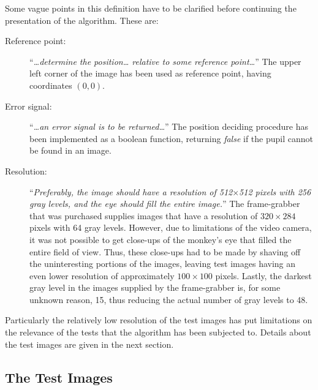 \noindent Some vague points in this definition have to be clarified
before continuing the presentation of the algorithm.  These are:
\begin{description}
\item[Reference point:] ``{\em\ldots determine the position\ldots
    relative to some reference point\ldots\/}'' The upper left corner
  of the image has been used as reference point, having coordinates
  $(0,0)$.
\item[Error signal:] ``{\em\ldots an error signal is to be
    returned\ldots\/}'' The position deciding procedure has been
  implemented as a boolean function, returning {\em false\/} if the
  pupil cannot be found in an image.
\item[Resolution:] ``{\em Preferably, the image should have a
    resolution of 512$\times$512 pixels with 256 gray levels, and the
    eye should fill the entire image.\/}'' The frame-grabber that was
  purchased supplies images that have a resolution of $320\times 284$
  pixels with 64 gray levels.  However, due to limitations of the
  video camera, it was not possible to get close-ups of the monkey's
  eye that filled the entire field of view.  Thus, these close-ups had
  to be made by shaving off the uninteresting portions of the images,
  leaving test images having an even lower resolution of approximately
  $100\times 100$ pixels.  Lastly, the darkest gray level in the
  images supplied by the frame-grabber is, for some unknown reason,
  15, thus reducing the actual number of gray levels to 48.
\end{description}
Particularly the relatively low resolution of the test images has
put limitations on the relevance of the tests that the algorithm has
been subjected to.  Details about the test images are given in the
next section.

\subsection{The Test Images}
\label{algo:intro:images}

